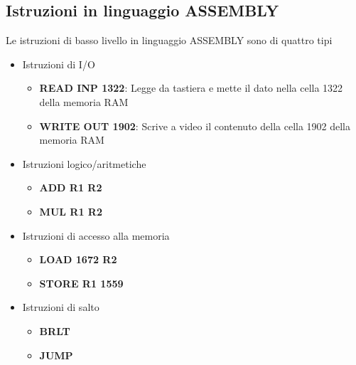 \documentclass[a4paper]{extarticle}
\begin{document}
\vspace{1em}
\subsection{Istruzioni in linguaggio ASSEMBLY}
Le istruzioni di basso livello in linguaggio ASSEMBLY sono di quattro tipi
\begin{itemize}
    \item Istruzioni di I/O
    \begin{itemize}
        \item \textbf{READ INP 1322}: Legge da tastiera e mette il dato nella cella 1322 della memoria RAM
        \item \textbf{WRITE OUT 1902}: Scrive a video il contenuto della cella 1902 della memoria RAM
    \end{itemize}
    \item Istruzioni logico/aritmetiche
    \begin{itemize}
        \item \textbf{ADD R1 R2}
        \item \textbf{MUL R1 R2}
    \end{itemize}
    \item Istruzioni di accesso alla memoria
    \begin{itemize}
        \item \textbf{LOAD 1672 R2}
        \item \textbf{STORE R1 1559}
    \end{itemize}
    \item Istruzioni di salto
    \begin{itemize}
        \item \textbf{BRLT}
        \item \textbf{JUMP}
    \end{itemize}
\end{itemize}
\end{document}
